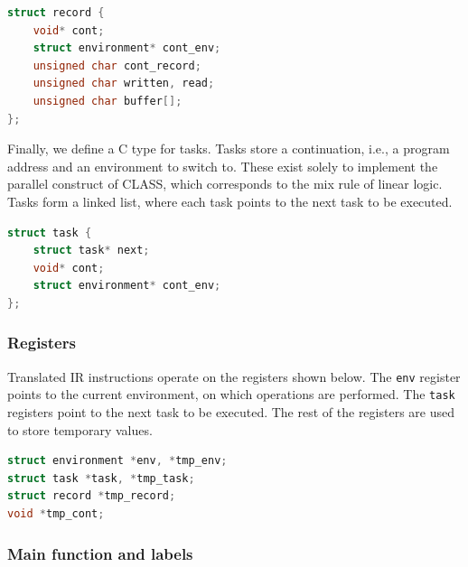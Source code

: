 \begin{lstlisting}[language=C]
struct record {
    void* cont;
    struct environment* cont_env;
    unsigned char cont_record;
    unsigned char written, read;
    unsigned char buffer[];
};
\end{lstlisting}



Finally, we define a C type for tasks. Tasks store a continuation, i.e., a program address and an environment to switch to. These exist solely to implement the parallel construct of CLASS, which corresponds to the mix rule of linear logic. Tasks form a linked list, where each task points to the next task to be executed.

\begin{lstlisting}[language=C]
struct task {
    struct task* next;
    void* cont;
    struct environment* cont_env;
};
\end{lstlisting}

\subsubsection{Registers}

Translated IR instructions operate on the registers shown below. The \texttt{env} register points to the current environment, on which operations are performed. The \texttt{task} registers point to the next task to be executed. The rest of the registers are used to store temporary values.

\begin{lstlisting}[language=C]
struct environment *env, *tmp_env;
struct task *task, *tmp_task;
struct record *tmp_record;
void *tmp_cont;
\end{lstlisting}

\subsubsection{Main function and labels}

